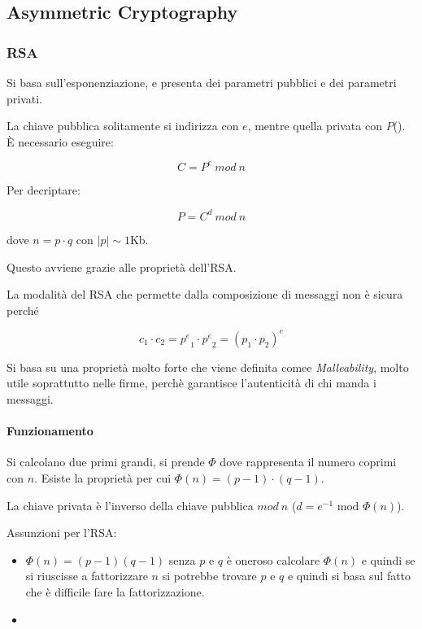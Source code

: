 \documentclass{book}
\begin{document}
\subsection{Asymmetric Cryptography}

\subsubsection{RSA}

Si basa sull'esponenziazione, e presenta dei parametri pubblici e dei parametri privati.


La chiave pubblica solitamente si indirizza con $e$, mentre quella privata con $P$(). È necessario eseguire:

\[ C = P^e\ mod\ n \]

Per decriptare:

\[ P = C^d\ mod\ n \]

dove $n = p \cdot q$ con $|p| \sim 1$Kb.

Questo avviene grazie alle proprietà dell'RSA.

La modalità del RSA che permette dalla composizione di messaggi non è sicura perché

\[ c_1 \cdot c_2 = {p^e}_1 \cdot {p^e}_2 = (p_1 \cdot p_2)^e\]


Si basa su una proprietà molto forte che viene definita comee \textit{Malleability}, molto utile soprattutto nelle firme, perchè garantisce l'autenticità di chi manda i messaggi.


\paragraph{Funzionamento}

Si calcolano due primi grandi, si prende $\Phi$ dove rappresenta il numero coprimi con $n$.
Esiste la proprietà per cui $\Phi(n) = (p-1) \cdot (q-1)$.

La chiave privata è l'inverso della chiave pubblica $mod\ n$ ($d = e^{-1}  \text{ mod } \Phi(n)$).

Assunzioni per l'RSA:
\begin{itemize}
	\item {} $\Phi(n) = (p-1)(q-1)$ senza $p$ e $q$ è oneroso calcolare $\Phi(n)$ e quindi se si riuscisse a fattorizzare $n$ si potrebbe trovare $p$ e $q$ e quindi si basa sul fatto che è difficile fare la fattorizzazione.
    \item {}
\end{itemize}
\end{document}
